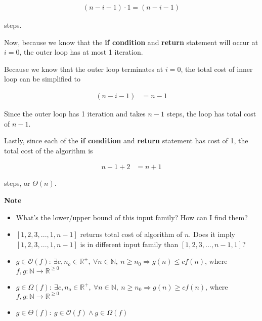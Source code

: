 \documentclass[12pt]{article}
\begin{document}
\begin{enumerate}[a.]
    \begin{align}
        (n-i-1) \cdot 1 = (n-i-1)
    \end{align}

    steps.

    \bigskip

    Now, because we know that the \textbf{if condition} and \textbf{return}
    statement will occur at $i = 0$, the outer loop has at most 1 iteration.

    \bigskip

    Because we know that the outer loop terminates at $i=0$, the total cost of
    inner loop can be simplified to

    \begin{align}
        (n-i-1) &= n-1
    \end{align}

    \bigskip

    Since the outer loop has 1 iteration and takes $n-1$ steps, the loop has
    total cost of $n-1$.

    \bigskip

    Lastly, since each of the \textbf{if condition} and \textbf{return} statement
    has cost of 1, the total cost of the algorithm is

    \begin{align}
        n-1+2 &= n+1
    \end{align}

    steps, or $\Theta(n)$.

    \bigskip

    \textbf{Note}

    \begin{itemize}
        \item
        What's the lower/upper bound of this input family? How can I find them?

        \item $[1,2,3,...,1,n-1]$ returns total cost of algorithm of $n$. Does it
        imply $[1,2,3,...,1,n-1]$ is in different input family than $[1,2,3,...,n-1,1]$?
        \item

        $g \in \mathcal{O}(f):\:\exists c,n_o \in \mathbb{R}^{+},\:\forall n \in
        \mathbb{N},\:n \geq n_0 \Rightarrow g(n) \leq cf(n)$, where $f,g:\mathbb{N} \to \mathbb{R}^{\geq 0}$

        \item

        $g \in \Omega(f):\:\exists c,n_o \in \mathbb{R}^{+},\:\forall n \in
        \mathbb{N},\:n \geq n_0 \Rightarrow g(n) \geq cf(n)$, where $f,g:\mathbb{N} \to \mathbb{R}^{\geq 0}$

        \item

        $g \in \Theta(f):\: g \in \mathcal{O}(f) \land g \in \Omega(f)$
    \end{itemize}

\end{enumerate}
\end{document}

